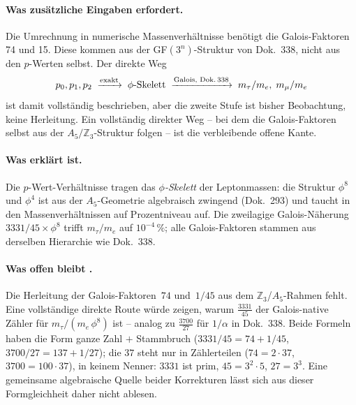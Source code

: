 \paragraph{Was zusätzliche Eingaben erfordert.}
Die Umrechnung in numerische Massenverhältnisse benötigt die
Galois-Faktoren 74 und 15. Diese kommen aus der GF$(3^n)$-Struktur
von Dok.~338, nicht aus den $p$-Werten selbst. Der direkte Weg
\[
  p_0,p_1,p_2 \;\xrightarrow{\text{exakt}}\; \phi\text{-Skelett}
  \;\xrightarrow{\text{Galois, Dok.\,338}}\; m_\tau/m_e,\;m_\mu/m_e
\]
ist damit vollständig beschrieben, aber die zweite Stufe ist bisher
Beobachtung, keine Herleitung. Ein vollständig direkter Weg -- bei
dem die Galois-Faktoren selbst aus der $A_5/\mathbb{Z}_3$-Struktur
folgen -- ist die verbleibende offene Kante.


\paragraph{Was erklärt ist.}
Die $p$-Wert-Verhältnisse tragen das \emph{$\phi$-Skelett} der Leptonmassen: die
Struktur $\phi^8$ und $\phi^4$ ist aus der $A_5$-Geometrie algebraisch zwingend
(Dok.~293) und taucht in den Massenverhältnissen auf Prozentniveau auf. Die zweilagige
Galois-Näherung $3331/45\times\phi^8$ trifft $m_\tau/m_e$ auf $10^{-4}\,\%$; alle
Galois-Faktoren stammen aus derselben Hierarchie wie Dok.~338.

\paragraph{Was offen bleibt \SM.}
Die Herleitung der Galois-Faktoren~$74$ und~$1/45$ aus dem $\mathbb{Z}_3$/$A_5$-Rahmen
fehlt. Eine vollständige direkte Route würde zeigen, warum
$\frac{3331}{45}$ der Galois-native Zähler für $m_\tau/(m_e\,\phi^8)$ ist -- analog zu
$\frac{3700}{27}$ für $1/\alpha$ in Dok.~338. Beide Formeln haben die Form ganze Zahl
$+$ Stammbruch ($3331/45 = 74 + 1/45$, $3700/27 = 137 + 1/27$); die $37$ steht nur in
Zählerteilen ($74 = 2\cdot37$, $3700 = 100\cdot37$), in keinem Nenner: $3331$ ist
prim, $45 = 3^2\cdot5$, $27 = 3^3$. Eine gemeinsame algebraische Quelle beider
Korrekturen lässt sich aus dieser Formgleichheit daher nicht ablesen.

